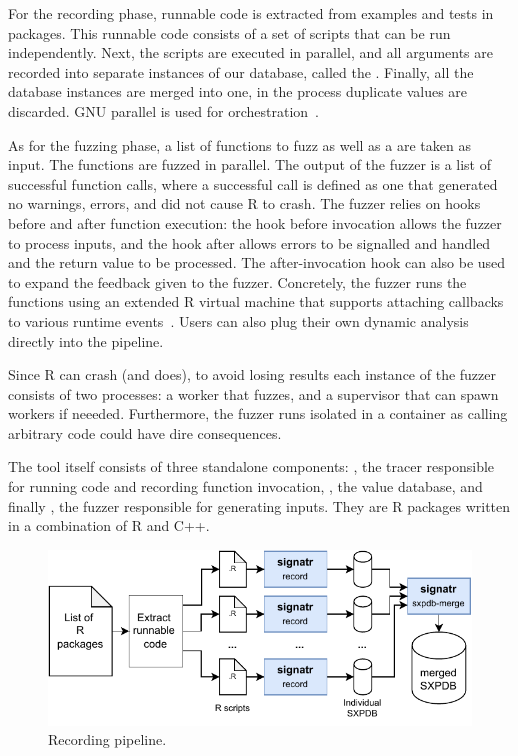 \documentclass[sigplan,nonacm,anonymous,review]{acmart}
\begin{document}
For the recording phase, runnable code is extracted from examples and
tests in packages.  This runnable code consists of a set of scripts
that can be run independently. Next, the scripts are
executed in parallel, and all arguments are recorded into separate instances of
our database, called the \sxpdb.  Finally, all the database instances
are merged into one, in the process duplicate values are discarded. GNU parallel is used for orchestration~\cite{tange2011_parallel}.

As for the fuzzing phase, a list of functions to fuzz as well as a
\sxpdb are taken as input. The functions are fuzzed in parallel.  The
output of the fuzzer is a list of successful function calls, where a
successful call is defined as one that generated no warnings, errors,
and did not cause R to crash.  The fuzzer relies on hooks before and
after function execution: the hook before invocation allows the fuzzer
to process inputs, and the hook after allows errors to be signalled
and handled and the return value to be processed.  The
after-invocation hook can also be used to expand the feedback given to
the fuzzer.  Concretely, the fuzzer runs the functions using an
extended R virtual machine that supports attaching callbacks to
various runtime events~\cite{goel2019}.  Users can also plug their own
dynamic analysis directly into the pipeline.

Since R can crash (and does), to avoid losing results each instance
of the fuzzer consists of two processes: a worker that fuzzes, and a
supervisor that can spawn workers if neeeded.  Furthermore, the fuzzer
runs isolated in a container as calling arbitrary code could have dire
consequences.

The tool itself consists of three standalone components: ,
the tracer responsible for running code and recording function
invocation, , the value database, and finally , the
fuzzer responsible for generating inputs. They are R
packages written in a combination of R and C++.

\begin{figure}
    \centering
    \includegraphics[width=\columnwidth]{code-and-figures/sxdb-pipeline.pdf}
    \caption{ Recording pipeline.  }\label{fig:sxpdb-pipeline}
\end{figure}
\end{document}
